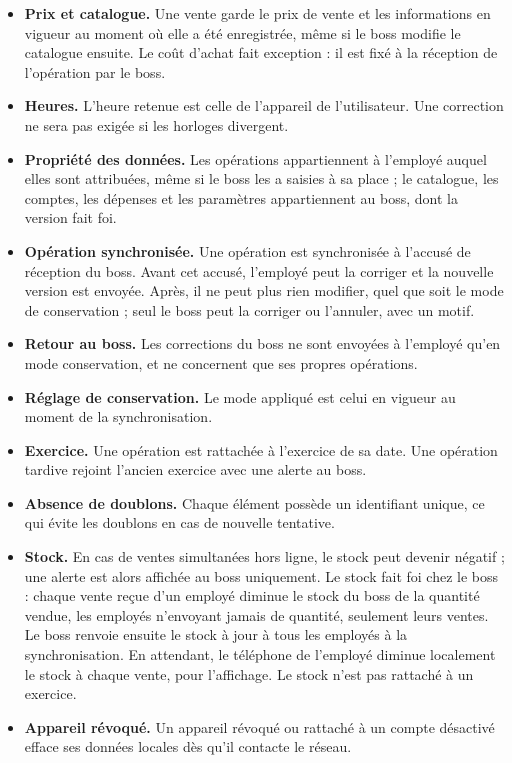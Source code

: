 \documentclass[11pt,a4paper]{article}
\begin{document}
	\begin{itemize}[leftmargin=*]
		\item \textbf{Prix et catalogue.} Une vente garde le prix de vente et les informations en vigueur au moment où elle a été enregistrée, même si le boss modifie le catalogue ensuite. Le coût d'achat fait exception : il est fixé à la réception de l'opération par le boss.
		\item \textbf{Heures.} L'heure retenue est celle de l'appareil de l'utilisateur. Une correction ne sera pas exigée si les horloges divergent.
		\item \textbf{Propriété des données.} Les opérations appartiennent à l'employé auquel elles sont attribuées, même si le boss les a saisies à sa place ; le catalogue, les comptes, les dépenses et les paramètres appartiennent au boss, dont la version fait foi.
		\item \textbf{Opération synchronisée.} Une opération est synchronisée à l'accusé de réception du boss. Avant cet accusé, l'employé peut la corriger et la nouvelle version est envoyée. Après, il ne peut plus rien modifier, quel que soit le mode de conservation ; seul le boss peut la corriger ou l'annuler, avec un motif.
		\item \textbf{Retour au boss.} Les corrections du boss ne sont envoyées à l'employé qu'en mode conservation, et ne concernent que ses propres opérations.
		\item \textbf{Réglage de conservation.} Le mode appliqué est celui en vigueur au moment de la synchronisation.
		\item \textbf{Exercice.} Une opération est rattachée à l'exercice de sa date. Une opération tardive rejoint l'ancien exercice avec une alerte au boss.
		\item \textbf{Absence de doublons.} Chaque élément possède un identifiant unique, ce qui évite les doublons en cas de nouvelle tentative.
		\item \textbf{Stock.} En cas de ventes simultanées hors ligne, le stock peut devenir négatif ; une alerte est alors affichée au boss uniquement. Le stock fait foi chez le boss : chaque vente reçue d'un employé diminue le stock du boss de la quantité vendue, les employés n'envoyant jamais de quantité, seulement leurs ventes. Le boss renvoie ensuite le stock à jour à tous les employés à la synchronisation. En attendant, le téléphone de l'employé diminue localement le stock à chaque vente, pour l'affichage. Le stock n'est pas rattaché à un exercice.
		\item \textbf{Appareil révoqué.} Un appareil révoqué ou rattaché à un compte désactivé efface ses données locales dès qu'il contacte le réseau.
	\end{itemize}
	
\end{document}
